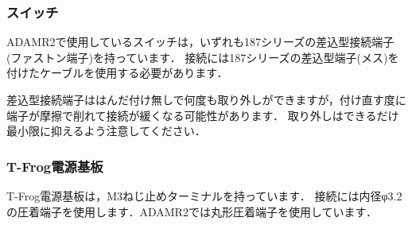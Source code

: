 \documentclass[{../../master}]{subfiles}
\begin{document}
  \subsubsection{スイッチ}
  ADAMR2で使用しているスイッチは，いずれも187シリーズの差込型接続端子(ファストン端子)を持っています．
  接続には187シリーズの差込型端子(メス)を付けたケーブルを使用する必要があります．

  差込型接続端子ははんだ付け無しで何度も取り外しができますが，付け直す度に端子が摩擦で削れて接続が緩くなる可能性があります．
  取り外しはできるだけ最小限に抑えるよう注意してください．

  \subsubsection{T-Frog電源基板}
  T-Frog電源基板は，M3ねじ止めターミナルを持っています．
  接続には内径φ3.2の圧着端子を使用します．ADAMR2では丸形圧着端子を使用しています．
\end{document}
